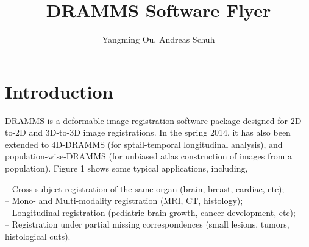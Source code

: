 \documentclass[a4paper,12pt]{article}
\title{DRAMMS Software Flyer}
\author{Yangming Ou, Andreas Schuh}
\begin{document}
\maketitle


\section{Introduction}
\label{intro}

DRAMMS is a deformable image registration software package designed for 2D-to-2D and 3D-to-3D image registrations. In the spring 2014, it has also been extended to 4D-DRAMMS (for sptail-temporal longitudinal analysis), and population-wise-DRAMMS (for unbiased atlas construction of images from a population). Figure 1 shows some typical applications, including, 

\indent -- Cross-subject registration of the same organ (brain, breast, cardiac, etc); \\
\indent -- Mono- and Multi-modality registration (MRI, CT, histology); \\
\indent -- Longitudinal registration (pediatric brain growth, cancer development, etc); \\
\indent -- Registration under partial missing correspondences (small lesions, tumors, histological cuts). \\
\end{document}
